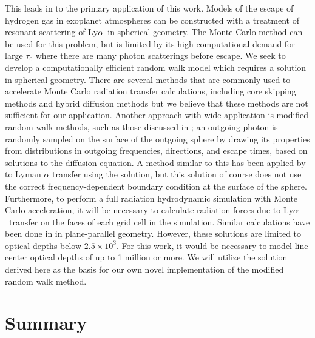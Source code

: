 \documentclass{aastex63}
\newcommand\lya{Ly$\alpha$\ }
\begin{document}
This leads in to the primary application of this work. Models of the escape of hydrogen gas in exoplanet atmospheres can be constructed with a treatment of resonant scattering of \lya in spherical geometry. The Monte Carlo method can be used for this problem, but is limited by its high computational demand for large $\tau_0$ where there are many photon scatterings before escape. We seek to develop a computationally efficient random walk model which requires a solution in spherical geometry. There are several methods that are commonly used to accelerate Monte Carlo radiation transfer calculations, including core skipping methods \citep{1968ApJ...153..783A,2002ApJ...567..922A} and hybrid diffusion methods \citep{2018MNRAS.479.2065S} but we believe that these methods are not sufficient for our application. Another approach with wide application is modified random walk methods, such as those discussed in \citet{1984JCoPh..54..508F, 2009A&A...497..155M, 2010A&A...520A..70R}; an outgoing photon is randomly sampled on the surface of the outgoing sphere by drawing its properties from distributions in outgoing frequencies, directions, and escape times, based on solutions to the diffusion equation. A method similar to this has been applied by \citet{2006ApJ...645..792T} to Lyman $\alpha$ transfer using the \cite{1990ApJ...350..216N} solution, but this solution of course does not use the correct frequency-dependent boundary condition at the surface of the sphere. Furthermore, to perform a full radiation hydrodynamic simulation with Monte Carlo acceleration, it will be necessary to calculate radiation forces due to \lya transfer on the faces of each grid cell in the simulation. Similar calculations have been done in \citet{1976ApJ...208..286W} in plane-parallel geometry. However, these solutions are limited to optical depths below $2.5 \times 10^3$. For this work, it would be necessary to model line center optical depths of up to 1 million or more. We will utilize the solution derived here as the basis for our own novel implementation of the modified random walk method.

\section{Summary}
\end{document}
